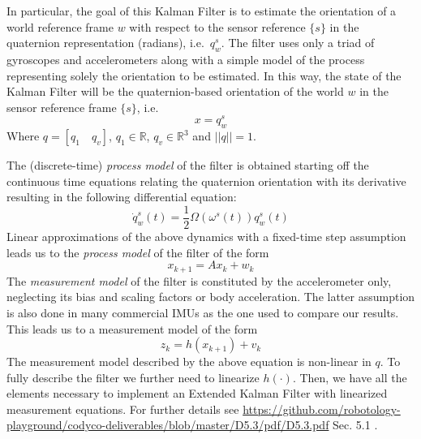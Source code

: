 In particular,
the goal of this Kalman Filter is to estimate the orientation of a world reference frame $w$ with respect to the sensor reference $\{s\}$ in the quaternion representation (radians), i.e.~$q^{s}_{w}$.  The filter uses only a triad of gyroscopes and accelerometers  along with a simple model of the process representing solely the orientation to be estimated. In this way, the state of the Kalman Filter will be the quaternion-based orientation of the world $w$ in the sensor reference frame $\{s\}$, i.e.
\begin{equation}
  x = q^{s}_{w}
\end{equation}
Where $q = [q_1 \quad q_v]$, $q_1 \in \mathbb{R}$, $q_v \in \mathbb{R}^3$ and $||q|| = 1$. 

The (discrete-time) \emph{process model} of the filter
 is obtained starting off the continuous time equations relating the quaternion orientation with its derivative resulting in the following differential equation:
 \begin{equation}
  \dot{q}^{s}_{w}(t) = \frac{1}{2}\Omega(\omega^{s}(t))q^{s}_{w}(t)
  \label{Eq:diffEq}
 \end{equation}
 Linear approximations of the above dynamics with a fixed-time step assumption leads us to the \emph{process model} of the filter of the form 
 \[x_{k+1} = Ax_k + w_k\]
The \emph{measurement model} of the filter is constituted by the accelerometer only, neglecting its bias and scaling factors or body acceleration. The latter assumption is also done in many commercial IMUs as the one used to compare our results. This leads us to a measurement model of the form
\[z_{k} = h(x_{k+1}) + v_{k}\]
 The measurement model described by the above equation is non-linear in $q$. To fully describe the filter we further need to linearize $h(\cdot)$. 
  Then, we have all the elements necessary to implement an Extended Kalman Filter with linearized measurement equations.
For further details see  \url{https://github.com/robotology-playground/codyco-deliverables/blob/master/D5.3/pdf/D5.3.pdf} Sec. 5.1 \cite{deliverable53}.






